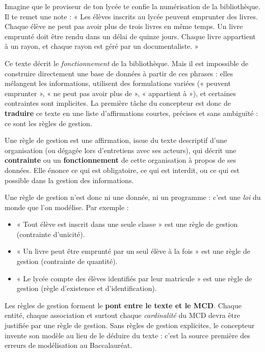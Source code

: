 \documentclass[11pt]{article}
\newcommand{\cle}[1]{{\popxbold\color{popdark}#1}}
\newcounter{popsec}
\newcounter{popsub}
\newcommand{\courssub}[1]{%
  \stepcounter{popsub}%
  \par\vspace{9pt}\noindent{\popxbold\fontsize{11.5}{13}\selectfont\color{popink}{\color{poporange}\thepopsec.\thepopsub}\hspace{6pt}#1}\par\nopagebreak\vspace{4pt}
}
\begin{document}
\courssub{Intuition : à quoi sert une règle de gestion ?}

Imagine que le proviseur de ton lycée te confie la numérisation de la bibliothèque. Il te remet une note : « Les élèves inscrits au lycée peuvent emprunter des livres. Chaque élève ne peut pas avoir plus de trois livres en même temps. Un livre emprunté doit être rendu dans un délai de quinze jours. Chaque livre appartient à un rayon, et chaque rayon est géré par un documentaliste. »

Ce texte décrit le \emph{fonctionnement} de la bibliothèque. Mais il est impossible de construire directement une base de données à partir de ces phrases : elles mélangent les informations, utilisent des formulations variées (« peuvent emprunter », « ne peut pas avoir plus de », « appartient à »), et certaines contraintes sont implicites. La première tâche du concepteur est donc de \textbf{traduire} ce texte en une liste d'affirmations courtes, précises et sans ambiguïté : ce sont les règles de gestion.

\begin{definition}
Une \cle{règle de gestion} est une affirmation, issue du texte descriptif d'une organisation (ou dégagée lors d'entretiens avec ses acteurs), qui décrit une \textbf{contrainte} ou un \textbf{fonctionnement} de cette organisation à propos de ses données. Elle énonce ce qui est obligatoire, ce qui est interdit, ou ce qui est possible dans la gestion des informations.
\end{definition}

Une règle de gestion n'est donc ni une donnée, ni un programme : c'est une \emph{loi} du monde que l'on modélise. Par exemple :

\begin{itemize}
\item « Tout élève est inscrit dans une seule classe » est une règle de gestion (contrainte d'unicité).
\item « Un livre peut être emprunté par un seul élève à la fois » est une règle de gestion (contrainte de quantité).
\item « Le lycée compte des élèves identifiés par leur matricule » est une règle de gestion (règle d'existence et d'identification).
\end{itemize}

\begin{aretenir}
Les règles de gestion forment le \textbf{pont entre le texte et le MCD}. Chaque entité, chaque association et surtout chaque \emph{cardinalité} du MCD devra être justifiée par une règle de gestion. Sans règles de gestion explicites, le concepteur invente son modèle au lieu de le déduire du texte : c'est la source première des erreurs de modélisation au Baccalauréat.
\end{aretenir}
\end{document}
